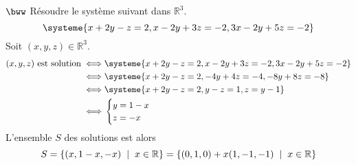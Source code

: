 \documentclass[11pt]{article}
\begin{document}
\begin{exercice}{$\bww$}{}
    Résoudre le système suivant dans $\mathbb{R}^3$.
    \begin{equation*}
        \systeme{
            x+2y-z=2,
            x-2y+3z=-2,
            3x-2y+5z=-2
        }
    \end{equation*}
    \tcblower
    Soit $(x,y,z)\in\mathbb{R}^3$.
    \begin{align*}
        (x,y,z) \text{ est solution}
        \iff&
        \systeme{
            x+2y-z=2,
            x-2y+3z=-2,
            3x-2y+5z=-2
        }\\ \iff&
        \systeme{
            x+2y-z=2,
            -4y+4z=-4,
            -8y+8z=-8
        }\\ \iff&
        \systeme{
            x+2y-z=2,
            y - z = 1,
            z = y - 1
        }\\ \iff&
        \begin{cases}
            y=1-x\\
            z=-x
        \end{cases}
    \end{align*}
    L'ensemble $S$ des solutions est alors 
    \begin{equation*}
        S = \left\{(x, 1-x, -x) \hspace{0.2cm} | \hspace{0.2cm} x \in \mathbb{R}\right\} = \left\{(0, 1, 0) + x(1,-1,-1) \hspace{0.2cm} | \hspace{0.2cm} x\in\mathbb{R}\right\}
    \end{equation*}
\end{exercice}

\pagebreak
\end{document}
